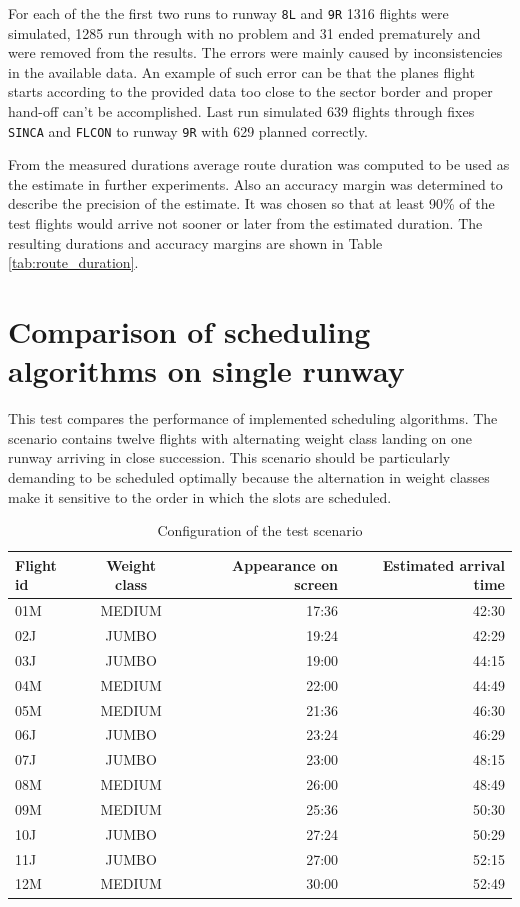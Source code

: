 For each of the the first two runs to runway \texttt{8L} and \texttt{9R} 1316 flights were simulated, 1285 run through with no problem and 31 ended prematurely and were removed from the results. The errors were mainly caused by inconsistencies in the available data. An example of such error can be that the planes flight starts according to the provided data too close to the sector border and proper hand-off can't be accomplished. Last run simulated 639 flights through fixes \texttt{SINCA} and \texttt{FLCON} to runway \texttt{9R} with 629 planned correctly.

From the measured durations average route duration was computed to be used as the estimate in further experiments. Also an accuracy margin was determined to describe the precision of the estimate. It was chosen so that at least 90\% of the test flights would arrive not sooner or later from the estimated duration. The resulting durations and accuracy margins are shown in Table \ref{tab:route_duration}.

\section{Comparison of scheduling algorithms on single runway}

This test compares the performance of implemented scheduling algorithms. The scenario contains twelve flights with alternating weight class landing on one runway arriving in close succession. This scenario should be particularly demanding to be scheduled optimally because the alternation in weight classes make it sensitive to the order in which the slots are scheduled.

\begin{table}[h]
  \centering
\begin{tabular}{ | l | c | r | r | }
\hline
Flight id	& Weight class	& Appearance on screen & Estimated arrival time	\\
\hline
01M	& MEDIUM	& 17:36	& 42:30	\\
02J	& JUMBO		& 19:24	& 42:29	\\
03J	& JUMBO		& 19:00	& 44:15	\\
04M	& MEDIUM	& 22:00	& 44:49	\\
05M	& MEDIUM	& 21:36	& 46:30	\\
06J	& JUMBO		& 23:24	& 46:29	\\
07J	& JUMBO		& 23:00	& 48:15	\\
08M	& MEDIUM	& 26:00	& 48:49	\\
09M	& MEDIUM	& 25:36	& 50:30	\\
10J	& JUMBO		& 27:24	& 50:29	\\
11J	& JUMBO		& 27:00	& 52:15	\\
12M	& MEDIUM	& 30:00	& 52:49	\\
\hline
\end{tabular}
  \caption{Configuration of the test scenario}
  \label{tab:config1}
\end{table}

